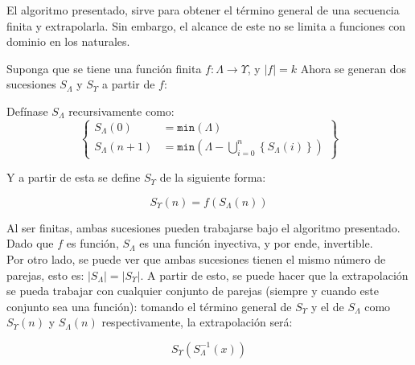 
El algoritmo presentado, sirve para obtener el término general de una
secuencia finita y extrapolarla. Sin embargo, el alcance de este
no se limita a funciones con dominio en los naturales.

Suponga que se tiene una función finita $f: \Lambda \to \Upsilon$, y $|f| = k$
Ahora se generan dos sucesiones $S_\Lambda$ y $S_\Upsilon$ a partir de $f$:

Defínase $S_\Lambda$ recursivamente como:
\[
\left\{
    \begin{aligned}
        S_\Lambda(0) &= \texttt{min}(\Lambda)\\
        S_\Lambda(n + 1) &= 
        \texttt{min}\left(\Lambda - \bigcup_{i=0}^{n}\left\{S_\Lambda(i)\right\} \right)
    \end{aligned}
\right\}
\]

Y a partir de esta se define $S_\Upsilon$ de la siguiente forma:

\[S_\Upsilon(n) = f(S_\Lambda(n))\]

Al ser finitas, ambas sucesiones pueden trabajarse bajo el algoritmo presentado.
Dado que $f$ es función, $S_\Lambda$ es una función inyectiva, y por ende, invertible.\\
Por otro lado, se puede ver que ambas sucesiones tienen el mismo número de parejas, esto es:
$\left|S_\Lambda \right| = \left|S_\Upsilon \right|$.
A partir de esto, se puede hacer que la extrapolación se pueda trabajar con cualquier conjunto
de parejas (siempre y cuando este conjunto sea una función): tomando el término general de $S_\Upsilon$ y el de $S_\Lambda$ como $S_\Upsilon(n)$ y $S_\Lambda(n)$ respectivamente, la extrapolación será:

\[S_\Upsilon\left(S_\Lambda^{-1}(x)\right)\]